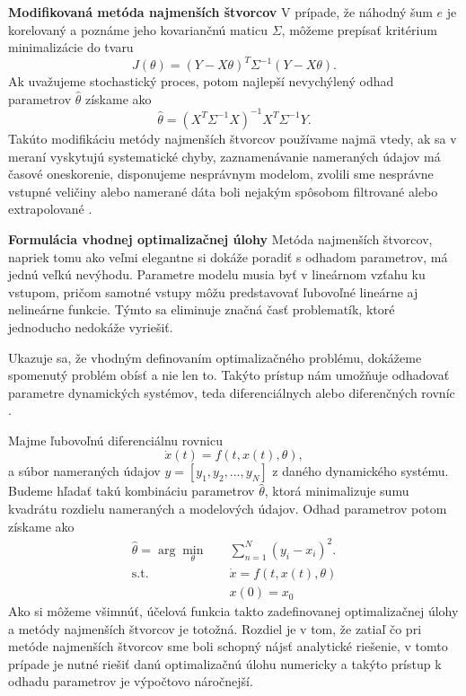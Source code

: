 \textbf{Modifikovaná metóda najmenších štvorcov}
\newline
V prípade, že náhodný šum $ e $ je korelovaný a poznáme jeho kovariančnú maticu $ \Sigma $, môžeme prepísať kritérium minimalizácie do tvaru 
\begin{equation}
	J\left(\theta\right) = \left(Y - X\theta \right)^T \Sigma^{-1} \left(Y - X\theta \right).
\end{equation}
Ak uvažujeme stochastický proces, potom najlepší nevychýlený odhad parametrov $ \hat{\theta} $ získame ako
\begin{equation}
	\hat{\theta} = \left(X^T \Sigma^{-1} X\right)^{-1}X^T \Sigma^{-1} Y.
\end{equation}
Takúto modifikáciu metódy najmenších štvorcov používame najmä vtedy, ak sa v meraní vyskytujú systematické chyby, zaznamenávanie nameraných údajov má časové oneskorenie, disponujeme nesprávnym modelom, zvolili sme nesprávne vstupné veličiny alebo namerané dáta boli nejakým spôsobom filtrované alebo extrapolované \cite{fikar:identifikacia:1999}.

\textbf{Formulácia vhodnej optimalizačnej úlohy}
\newline
Metóda najmenších štvorcov, napriek tomu ako veľmi elegantne si dokáže poradiť s odhadom parametrov, má jednú veľkú nevýhodu. Parametre modelu musia byť v lineárnom vzťahu ku vstupom, pričom samotné vstupy môžu predstavovať ľubovoľné lineárne aj nelineárne funkcie. Týmto sa eliminuje značná časť problematík, ktoré jednoducho nedokáže vyriešiť. 

Ukazuje sa, že vhodným definovaním optimalizačného problému, dokážeme spomenutý problém obísť a nie len to. Takýto prístup nám umožňuje odhadovať parametre dynamických systémov, teda diferenciálnych alebo diferenčných rovníc \cite{villaverde:opt_param_est:2018}.

Majme ľubovoľnú diferenciálnu rovnicu
\begin{equation}
	\dot{x}(t) = f\left( t,x(t),\theta \right),
\end{equation} 
a súbor nameraných údajov $ y = [y_1, y_2, \dots , y_N] $ z daného dynamického systému. Budeme hľadať takú kombináciu parametrov $ \hat{\theta} $, ktorá minimalizuje sumu kvadrátu rozdielu nameraných a modelových údajov. Odhad parametrov potom získame ako
\begin{equation}
	\begin{split}
		\hat{\theta} = \arg \min_{\theta} \quad & \sum_{n=1}^{N} \left(y_{i} - x_{i}\right)^2. \\
		\textrm{s.t.} \quad & \dot{x} = f\left( t,x(t),\theta \right)\\
		 & x(0) = x_0
	\end{split}
	\label{eq:param_est_opt_form}
\end{equation} 
Ako si môžeme všimnúť, účelová funkcia takto zadefinovanej optimalizačnej úlohy a metódy najmenších štvorcov je totožná. Rozdiel je v tom, že zatiaľ čo pri metóde najmenších štvorcov sme boli schopný nájsť analytické riešenie, v tomto prípade je nutné riešiť danú optimalizačnú úlohu numericky a takýto prístup k odhadu parametrov je výpočtovo náročnejší.

